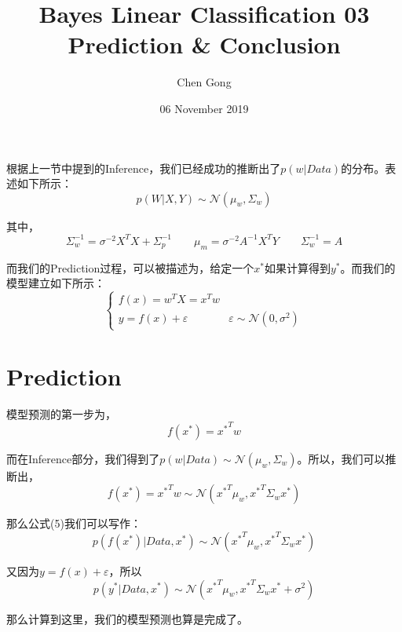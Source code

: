 \documentclass[a4paper]{article}
\title{Bayes Linear Classification 03 Prediction \& Conclusion}
\author{Chen Gong}
\date{06 November 2019}
\begin{document}
\maketitle
根据上一节中提到的Inference，我们已经成功的推断出了$p(w|Data)$的分布。表述如下所示：
\begin{equation}
    p(W|X,Y) \sim \mathcal{N}(\mu_w, \Sigma_w)
\end{equation}

其中，
\begin{equation}
    \Sigma_w^{-1}=\sigma^{-2}X^TX+\Sigma_p^{-1} \qquad \mu_m = \sigma^{-2}A^{-1}X^TY \qquad \Sigma_w^{-1}=A
\end{equation}

而我们的Prediction过程，可以被描述为，给定一个$x^\ast$如果计算得到$y^\ast$。而我们的模型建立如下所示：
\begin{equation}
\left\{
\begin{array}{ll}
      f(x)=w^TX = x^Tw & \\
      y = f(x) + \varepsilon & \varepsilon \sim \mathcal{N}(0,\sigma^2)
\end{array}
\right.    
\end{equation}

\section{Prediction}
模型预测的第一步为，
\begin{equation}
    f(x^\ast) = {x^\ast}^T w 
\end{equation}

而在Inference部分，我们得到了$p(w|Data)\sim \mathcal{N}(\mu_w,\Sigma_w)$。所以，我们可以推断出，
\begin{equation}
    f(x^\ast) = {x^\ast}^T w \sim \mathcal{N}({x^\ast}^T\mu_w, {x^\ast}^T\Sigma_w{x^\ast})
\end{equation}

那么公式(5)我们可以写作：
\begin{equation}
    p(f(x^\ast)|Data,x^\ast) \sim \mathcal{N}({x^\ast}^T\mu_w, {x^\ast}^T\Sigma_w{x^\ast})
\end{equation}

又因为$y = f(x) + \varepsilon$，所以
\begin{equation}
    p(y^\ast|Data,x^\ast) \sim \mathcal{N}({x^\ast}^T\mu_w, {x^\ast}^T\Sigma_w{x^\ast}+\sigma^2)
\end{equation}

那么计算到这里，我们的模型预测也算是完成了。
\end{document}
